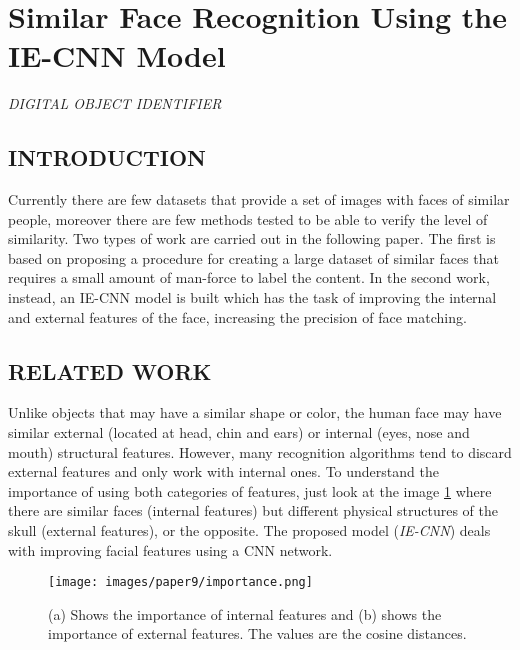 \section{Similar Face Recognition Using the IE-CNN Model}

\begin{center}
    \author{
    An-Ping Song,
    Qian Hu,
    Xue-Hai Ding,
    Xin-Yi Di,
    Zi-Heng Song
    }
\end{center}

\begin{center}
    \emph{DIGITAL OBJECT IDENTIFIER}
\end{center}

\subsection{INTRODUCTION}
Currently there are few datasets that provide a set of images with faces of 
similar people, moreover there are few methods tested to be able to verify 
the level of similarity. Two types of work are carried out in the following paper. 
The first is based on proposing a procedure for creating a large dataset of 
similar faces that requires a small amount of man-force to label the content. 
In the second work, instead, an IE-CNN model is built which has the task 
of improving the internal and external features of the face, increasing the 
precision of face matching.

\subsection{RELATED WORK}
Unlike objects that may have a similar shape or color, the human face may 
have similar external (located at head, chin and ears) or internal (eyes, nose 
and mouth) structural features. However, many recognition algorithms tend 
to discard external features and only work with internal ones. To understand 
the importance of using both categories of features, just look at the image \ref{fig:features} 
where there are similar faces (internal features) but different physical structures 
of the skull (external features), or the opposite. The proposed model 
(\emph{IE-CNN}) deals with improving facial features using a CNN network.
\begin{figure}[h!]
    \centering
    \texttt{[image: images/paper9/importance.png]}
    \centering
    \caption{(a) Shows the importance of internal features and (b) shows the importance of external features. The values are the cosine distances.}
    \label{fig:features}
\end{figure}

